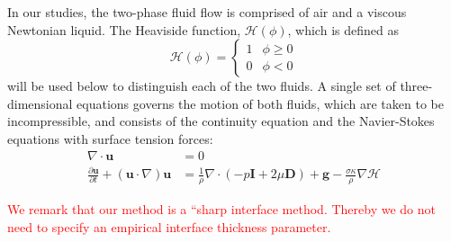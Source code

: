 \documentclass{elsarticle}
\newcommand{\Hea}{\mathcal{H}}
\newcommand{\vv}{\mathbf}
\newcommand{\bmD}{\vv{D}}
\newcommand{\bmg}{\vv{g}}
\newcommand{\bmI}{\vv{I}}
\newcommand{\bmu}{\vv{u}}
\begin{document}
\par 
In our studies, the two-phase fluid flow is comprised of air and a viscous Newtonian liquid.  The Heaviside function, $\Hea(\phi)$, which is defined as
\begin{equation}\label{heavyeqn}
  \Hea(\phi) = \begin{cases}
               1 & \phi \geq 0 \\
               0 & \phi <0 
               \end{cases}
\end{equation}
will be used below to distinguish each of the two fluids.  A single set of
three-dimensional equations governs the motion of both fluids, which are taken
to be incompressible, and consists of the continuity equation and the
Navier-Stokes equations with surface tension forces:
\begin{align}
  \nabla\cdot\bmu &=0  \label{divu} \\
  \frac{\partial\bmu}{\partial t}+(\bmu\cdot\nabla)\bmu &=
  \frac{1}{\rho}\nabla\cdot(-p\bmI+2\mu\bmD)+\bmg-
  \frac{\sigma\kappa}{\rho}\nabla \Hea  
  \label{nseqn}
\end{align}

\textcolor{red}
{
	We remark that our method is a ``sharp interface method\cite{SusSmiHusOhtZhi07,Sus03,KanFedLiu00}.  Thereby we do not need to specify an empirical interface thickness parameter\cite{SusSmeOsh94,SusPuc00}.
}
\end{document}
